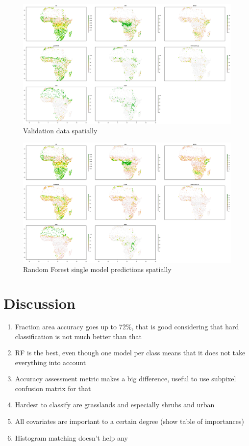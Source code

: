 \documentclass[a4paper,10pt]{article}
\begin{document}
\begin{figure}
    \includegraphics[width=\textwidth]{article-figures/maps/2019-04-10-rasterised-validation}
    \caption{Validation data spatially}
    \label{raster-validation}
\end{figure}
\begin{figure}
    \includegraphics[width=\textwidth]{article-figures/maps/2019-04-10-rasterised-rf-1m-uncor}
    \caption{Random Forest single model predictions spatially}
    \label{raster-rf-1m-uncor}
\end{figure}

\section{Discussion}

\begin{enumerate}
 \item Fraction area accuracy goes up to 72\%, that is good considering that hard classification is not much better than that
 \item RF is the best, even though one model per class means that it does not take everything into account
 \item Accuracy assessment metric makes a big difference, useful to use subpixel confusion matrix for that
 \item Hardest to classify are grasslands and especially shrubs and urban
 \item All covariates are important to a certain degree (show table of importances)
 \item Histogram matching doesn't help any
\end{enumerate}
\end{document}
